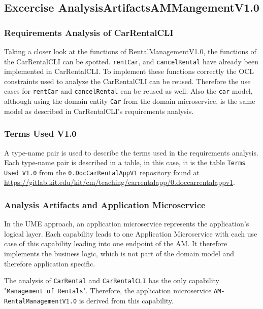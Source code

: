 \subsection{Excercise AnalysisArtifactsAMMangementV1.0}
\subsubsection*{Requirements Analysis of CarRentalCLI}
Taking a closer look at the functions of RentalManagementV1.0, the functions of the CarRentalCLI can be spotted.
\texttt{rentCar}, and \texttt{cancelRental} have already been implemented in CarRentalCLI.
To implement these functions correctly the OCL constraints used to analyze the CarRentalCLI can be reused.
Therefore the use cases for \texttt{rentCar} and \texttt{cancelRental} can be reused as well.
Also the \texttt{car} model, although using the domain entity \texttt{Car} from the domain microservice, is the same model as described in CarRentalCLI's requirements analysis.
\subsubsection*{Terms Used V1.0}
A type-name pair is used to describe the terms used in the requirements analysis.
Each type-name pair is described in a table, in this case, it is the table \texttt{Terms Used V1.0} from the \texttt{0.DocCarRentalAppV1} repository found at \url{https://gitlab.kit.edu/kit/cm/teaching/carrentalapp/0.doccarrentalappv1}.

\subsubsection*{Analysis Artifacts and Application Microservice}
In the UME approach, an application microservice represents the application's logical layer.
Each capability leads to one Application Microservice with each use case of this capability leading into one endpoint of the AM.
It therefore implements the business logic, which is not part of the domain model and therefore application specific.

The analysis of \texttt{CarRental} and \texttt{CarRentalCLI} has the only capability "\texttt{Management of Rentals}".
Therefore, the application microservice \texttt{AM-RentalManagementV1.0} is derived from this capability.

